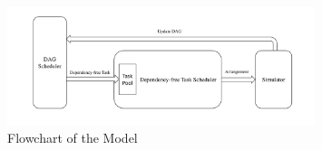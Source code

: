 \begin{figure}
\includegraphics[width=0.8\textwidth]{figure/Fig-FlowChart.pdf}
\centering
\caption{Flowchart of the Model} \label{Fig-Flowchart}
\end{figure}